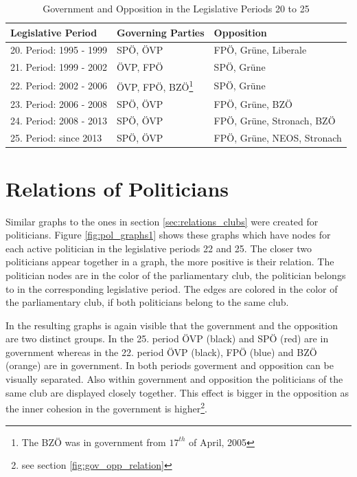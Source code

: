 \begin{table}

\centering
\bgroup
\def\arraystretch{1.2}
\begin{tabular}{| p{4cm} | p{3cm} | l |}
\hline
  Legislative Period & Governing Parties & Opposition  \\
\hline
\hline
  20. Period: 1995 - 1999 & SPÖ, ÖVP & FPÖ, Grüne, Liberale \\
\hline
  21. Period: 1999 - 2002 & ÖVP, FPÖ & SPÖ, Grüne \\
\hline
  22. Period: 2002 - 2006 & ÖVP, FPÖ, BZÖ\footnote{The BZÖ was in government from $17^{th}$ of April, 2005} & SPÖ, Grüne \\
\hline
  23. Period: 2006 - 2008 & SPÖ, ÖVP & FPÖ, Grüne, BZÖ \\
\hline
  24. Period: 2008 - 2013 & SPÖ, ÖVP & FPÖ, Grüne, Stronach, BZÖ \\
\hline
  25. Period: since 2013 & SPÖ, ÖVP & FPÖ, Grüne, NEOS, Stronach \\
\hline

\end{tabular}
\egroup
\caption{Government and Opposition in the Legislative Periods 20 to 25}
\label{table:gov_opp_parties}
\end{table}


\section{Relations of Politicians}
\label{sec:relations_pol}
Similar graphs to the ones in section \ref{sec:relations_clubs} were created for politicians. Figure \ref{fig:pol_graphs1} shows these graphs which have nodes for each active politician in the legislative periods 22 and 25. The closer two politicians appear together in a graph, the more positive is their relation. The politician nodes are in the color of the parliamentary club, the politician belongs to in the corresponding legislative period. The edges are colored in the color of the parliamentary club, if both politicians belong to the same club.

In the resulting graphs is again visible that the government and the opposition are two distinct groups. In the 25. period ÖVP (black) and SPÖ (red) are in government whereas in the 22. period ÖVP (black), FPÖ (blue) and BZÖ (orange) are in government. In both periods goverment and opposition can be visually separated. Also within government and opposition the politicians of the same club are displayed closely together. This effect is bigger in the opposition as the inner cohesion in the government is higher\footnote{see section \ref{fig:gov_opp_relation}}.

